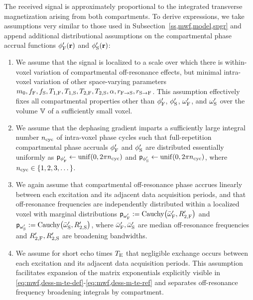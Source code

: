 The received signal is approximately proportional
to the integrated transverse magnetization
arising from both compartments.
To derive expressions,
we take assumptions very similar 
to those used in Subsection~\ref{ss,mwf,model,spgr}
and append additional distributional assumptions
on the compartmental phase accrual functions 
$\phipf\pr$ and $\phips\pr$:
\begin{enumerate}
	\item We assume that the signal is localized
		to a scale over which there is within-voxel variation
		of compartmental off-resonance effects, 
		but minimal intra-voxel variation 
		of other space-varying parameters
		$m_0, f_{\mathrm{F}}, f_{\mathrm{S}}, T_{1,\mathrm{F}}, T_{1,\mathrm{S}}, T_{2,\mathrm{F}}, T_{2,\mathrm{S}}, \alpha, r_{\mathrm{F}\to\mathrm{S}}, r_{\mathrm{S}\to\mathrm{F}}$.
		This assumption effectively fixes all compartmental properties
		other than $\phi'_{\mathrm{F}}$, $\phi'_{\mathrm{S}}$, $\omega'_{\mathrm{F}}$, and $\omega'_{\mathrm{S}}$
		over the volume $\mathbb{V}$ 
		of a sufficiently small voxel.
		\label{item:dess,int} 
		
	\item
		We assume 
		that the dephasing gradient imparts 
		a sufficiently large integral number $n_\mathrm{cyc}$ 
		of intra-voxel phase cycles
		such that full-repetition compartmental phase accruals
		$\phi'_{\mathrm{F}}$ and $\phi'_{\mathrm{S}}$ 
		are distributed essentially uniformly
		as $\dist{\phipf} \gets \unif{0,2\pi\cyc}$ 
		and $\dist{\phips} \gets \unif{0,2\pi\cyc}$, 
		where $\cyc \in \set{1,2,3,\dots}$.
		\label{item:dess,ph}
		
	\item 
		We again assume
		that compartmental off-resonance phase accrues linearly
		between each excitation 
		and its adjacent data acquisition periods,
		and that off-resonance frequencies
		are independently distributed 
		within a localized voxel 
		with marginal distributions
		$\dist{\ompf} := \operatorname{Cauchy}\paren{\ompfmed,\Rtpf}$
		and $\dist{\omps} := \operatorname{Cauchy}\paren{\ompsmed,\Rtps}$,
		where $\bar{\omega}_{\mathrm{F}}',\bar{\omega}_{\mathrm{S}}'$ are median off-resonance frequencies
		and $R_{2,\mathrm{F}}',R_{2,\mathrm{S}}'$ are broadening bandwidths.
		\label{item:dess,freq}
		
	\item 
		We assume 
		for short echo times $T_\mathrm{E}$
		that negligible exchange occurs
		between each excitation 
		and its adjacent data acquisition periods.
		This assumption facilitates expansion 
		of the matrix exponentials
		explicitly visible 
		in \eqref{eq:mwf,dess-m-te-def}-\eqref{eq:mwf,dess-m-te-ref}
		and separates off-resonance frequency broadening integrals
		by compartment.
		\label{item:dess,exchg0}
\end{enumerate}
